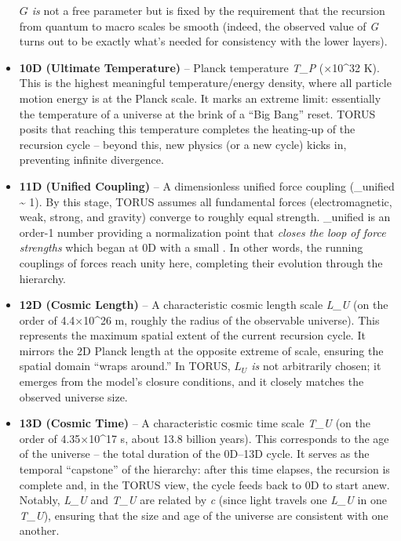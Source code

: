 \documentclass[
]{article}
\begin{document}
\begin{itemize}
  \emph{$G$ is} not a free parameter but is fixed by the requirement that
  the recursion from quantum to macro scales be smooth (indeed, the
  observed value of \emph{G} turns out to be exactly what's needed for
  consistency with the lower layers)\hspace{0pt}.
\item
  \textbf{10D (Ultimate Temperature)} -- Planck temperature
  \emph{T_{P}{}} (×10\^{}32 K)\hspace{0pt}. This is the highest meaningful
  temperature/energy density, where all particle motion energy is at the
  Planck scale. It marks an extreme limit: essentially the temperature
  of a universe at the brink of a ``Big Bang'' reset. TORUS posits that
  reaching this temperature completes the heating-up of the recursion
  cycle\hspace{0pt} -- beyond this, new physics (or a new cycle) kicks
  in, preventing infinite divergence.
\item
  \textbf{11D (Unified Coupling)} -- A dimensionless unified force
  coupling
  (\alpha_{unified}{}
  \textasciitilde{} 1)\hspace{0pt}. By this stage, TORUS assumes all
  fundamental forces (electromagnetic, weak, strong, and gravity)
  converge to roughly equal strength.
  \alpha_{unified}{} is an
  order-1 number providing a normalization point that \emph{closes the
  loop of force strengths} which began at 0D with a small \alpha. In other
  words, the running couplings of forces reach unity here, completing
  their evolution through the hierarchy\hspace{0pt}.
\item
  \textbf{12D (Cosmic Length)} -- A characteristic cosmic length scale
  \emph{L_{U}{}} (on the
  order of 4.4×10\^{}26 m, roughly the radius of the observable
  universe)\hspace{0pt}. This represents the maximum spatial extent of
  the current recursion cycle. It mirrors the 2D Planck length at the
  opposite extreme of scale, ensuring the spatial domain ``wraps
  around.'' In TORUS,
  \emph{$L_{U}{}$ is} not
  arbitrarily chosen; it emerges from the model's closure conditions,
  and it closely matches the observed universe size.
\item
  \textbf{13D (Cosmic Time)} -- A characteristic cosmic time scale
  \emph{T_{U}{}} (on the
  order of 4.35×10\^{}17 s, about 13.8 billion years)\hspace{0pt}. This
  corresponds to the age of the universe -- the total duration of the
  0D--13D cycle. It serves as the temporal ``capstone'' of the
  hierarchy: after this time elapses, the recursion is complete and, in
  the TORUS view, the cycle feeds back to 0D to start anew. Notably,
  \emph{L_{U}{}} and
  \emph{T_{U}{}} are
  related by \emph{c} (since light travels one
  \emph{L_{U}{}} in one
  \emph{T_{U}{}}),
  ensuring that the size and age of the universe are consistent with one
  another\hspace{0pt}.
\end{itemize}
\end{document}
